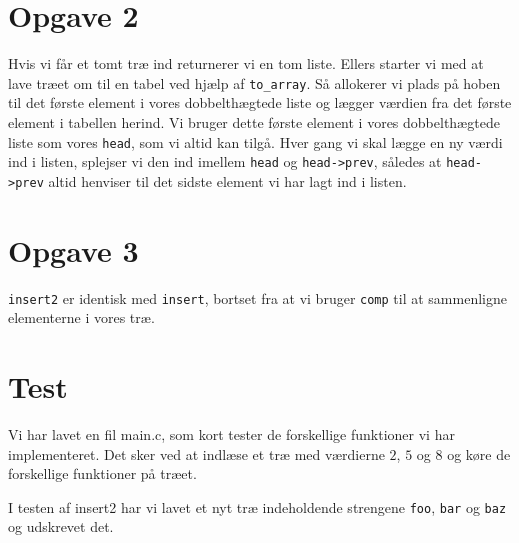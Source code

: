 \documentclass [10pt,a4paper]{article}
\begin{document}
\section*{Opgave 2}

Hvis vi får et tomt træ ind returnerer vi en tom liste.
Ellers starter vi med at lave træet om til en tabel ved hjælp af
\verb+to_array+. Så allokerer vi plads på hoben til det første element
i vores dobbelthægtede liste og lægger værdien fra det første element
i tabellen herind. Vi bruger dette første element i vores
dobbelthægtede liste som vores \verb+head+, som vi altid kan
tilgå. Hver gang vi skal lægge en ny værdi ind i listen, splejser vi
den ind imellem \verb+head+ og \verb+head->prev+, således at
\verb+head->prev+ altid henviser til det sidste element vi har lagt
ind i listen.

\section*{Opgave 3}

\verb+insert2+ er identisk med \verb+insert+, bortset fra at vi bruger
\verb+comp+ til at sammenligne elementerne i vores træ.

\section*{Test}

Vi har lavet en fil main.c, som kort tester de forskellige funktioner
vi har implementeret. Det sker ved at indlæse et træ med værdierne
$2$, $5$ og $8$ og køre de forskellige funktioner på træet.

I testen af insert2 har vi lavet et nyt træ indeholdende strengene
\verb+foo+, \verb+bar+ og \verb+baz+ og udskrevet det.
\end{document}
